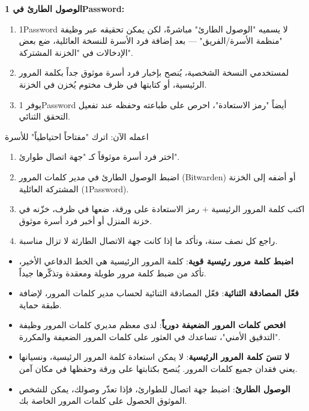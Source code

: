 \textbf{الوصول الطارئ في 1Password:}

\begin{enumerate}
  \item 1Password لا يسميه "الوصول الطارئ" مباشرةً، لكن يمكن تحقيقه عبر وظيفة "منظمة الأسرة/الفريق" — بعد إضافة فرد الأسرة للنسخة العائلية، ضع بعض الإدخالات في "الخزنة المشتركة".
  \item لمستخدمي النسخة الشخصية، يُنصح بإخبار فرد أسرة موثوق جداً بكلمة المرور الرئيسية، أو كتابتها في ظرف مختوم يُخزن في الخزنة.
  \item يوفر 1Password أيضاً "رمز الاستعادة"، احرص على طباعته وحفظه عند تفعيل التحقق الثنائي.
\end{enumerate}

\begin{tcbpractice}{اعمله الآن: اترك "مفتاحاً احتياطياً" للأسرة}
\begin{enumerate}
  \item اختر فرد أسرة موثوقاً كـ "جهة اتصال طوارئ".
  \item اضبط الوصول الطارئ في مدير كلمات المرور (Bitwarden) أو أضفه إلى الخزنة المشتركة العائلية (1Password).
  \item اكتب كلمة المرور الرئيسية + رمز الاستعادة على ورقة، ضعها في ظرف، خزّنه في خزنة المنزل أو أخبر فرد أسرة موثوق.
  \item راجع كل نصف سنة، وتأكد ما إذا كانت جهة الاتصال الطارئة لا تزال مناسبة.
\end{enumerate}

\end{tcbpractice}


\begin{itemize}
  \item \textbf{اضبط كلمة مرور رئيسية قوية}: كلمة المرور الرئيسية هي الخط الدفاعي الأخير، تأكد من ضبط كلمة مرور طويلة ومعقدة وتذكّرها جيداً.
  \item \textbf{فعّل المصادقة الثنائية}: فعّل المصادقة الثنائية لحساب مدير كلمات المرور، لإضافة طبقة حماية.
  \item \textbf{افحص كلمات المرور الضعيفة دورياً}: لدى معظم مديري كلمات المرور وظيفة "التدقيق الأمني"، تساعدك في العثور على كلمات المرور الضعيفة والمكررة.
  \item \textbf{لا تنسَ كلمة المرور الرئيسية}: لا يمكن استعادة كلمة المرور الرئيسية، ونسيانها يعني فقدان جميع كلمات المرور. يُنصح بكتابتها على ورقة وحفظها في مكان آمن.
  \item \textbf{الوصول الطارئ}: اضبط جهة اتصال للطوارئ، فإذا تعذّر وصولك، يمكن للشخص الموثوق الحصول على كلمات المرور الخاصة بك.
\end{itemize}

